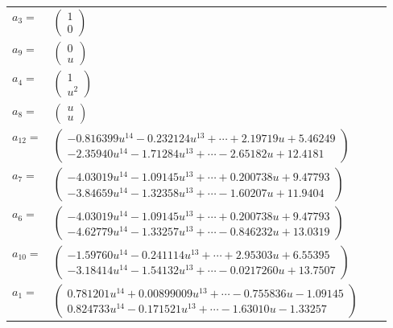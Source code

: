 \documentclass[1p]{elsarticle_modified}
\theoremstyle{definition}
\begin{document}
\begin{tabular}{m{7pt} m{180pt} m{7pt} m{180pt} }
\flushright $a_{3}=$&$\begin{pmatrix}1\\0\end{pmatrix}$ \\
\flushright $a_{9}=$&$\begin{pmatrix}0\\u\end{pmatrix}$ \\
\flushright $a_{4}=$&$\begin{pmatrix}1\\u^2\end{pmatrix}$ \\
\flushright $a_{8}=$&$\begin{pmatrix}u\\u\end{pmatrix}$ \\
\flushright $a_{12}=$&$\begin{pmatrix}-0.816399 u^{14}-0.232124 u^{13}+\cdots+2.19719 u+5.46249\\-2.35940 u^{14}-1.71284 u^{13}+\cdots-2.65182 u+12.4181\end{pmatrix}$ \\
\flushright $a_{7}=$&$\begin{pmatrix}-4.03019 u^{14}-1.09145 u^{13}+\cdots+0.200738 u+9.47793\\-3.84659 u^{14}-1.32358 u^{13}+\cdots-1.60207 u+11.9404\end{pmatrix}$ \\
\flushright $a_{6}=$&$\begin{pmatrix}-4.03019 u^{14}-1.09145 u^{13}+\cdots+0.200738 u+9.47793\\-4.62779 u^{14}-1.33257 u^{13}+\cdots-0.846232 u+13.0319\end{pmatrix}$ \\
\flushright $a_{10}=$&$\begin{pmatrix}-1.59760 u^{14}-0.241114 u^{13}+\cdots+2.95303 u+6.55395\\-3.18414 u^{14}-1.54132 u^{13}+\cdots-0.0217260 u+13.7507\end{pmatrix}$ \\
\flushright $a_{1}=$&$\begin{pmatrix}0.781201 u^{14}+0.00899009 u^{13}+\cdots-0.755836 u-1.09145\\0.824733 u^{14}-0.171521 u^{13}+\cdots-1.63010 u-1.33257\end{pmatrix}$ \\

\end{tabular}
\end{document}
